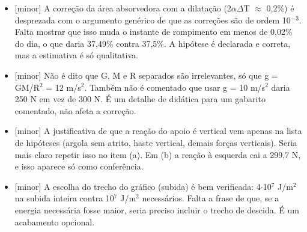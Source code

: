 \documentclass{article}%
\begin{document}
\begin{itemize}%
\item%
{[}minor{]} A correção da área absorvedora com a dilatação (2$\alpha$$\Delta$T $\approx$ 0,2\%) é desprezada com o argumento genérico de que as correções são de ordem 10$^{-}$$^3$. Falta mostrar que isso muda o instante de rompimento em menos de 0,02\% do dia, o que daria 37,49\% contra 37,5\%. A hipótese é declarada e correta, mas a estimativa é só qualitativa.%
\item%
{[}minor{]} Não é dito que G, M e R separados são irrelevantes, só que g = GM/R$^2$ = 12 m/s$^2$. Também não é comentado que usar g = 10 m/s$^2$ daria 250 N em vez de 300 N. É um detalhe de didática para um gabarito comentado, não afeta a correção.%
\item%
{[}minor{]} A justificativa de que a reação do apoio é vertical vem apenas na lista de hipóteses (argola sem atrito, haste vertical, demais forças verticais). Seria mais claro repetir isso no item (a). Em (b) a reação à esquerda cai a 299,7 N, e isso aparece só como conferência.%
\item%
{[}minor{]} A escolha do trecho do gráfico (subida) é bem verificada: 4$\cdot$10$^{7}$ J/m$^2$ na subida inteira contra 10$^{7}$ J/m$^2$ necessários. Falta a frase de que, se a energia necessária fosse maior, seria preciso incluir o trecho de descida. É um acabamento opcional.%
\end{itemize}%
\end{document}
